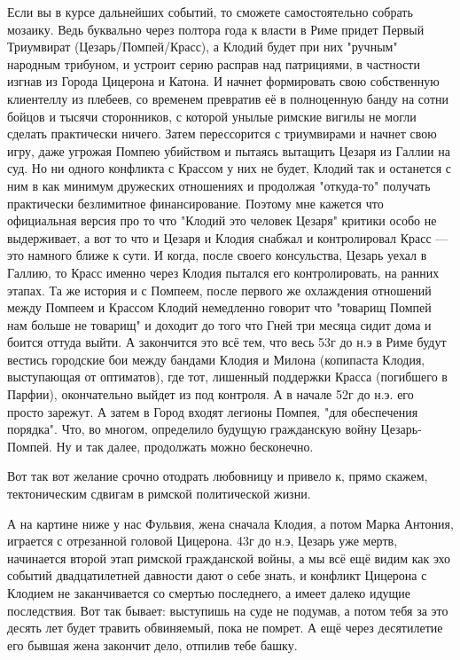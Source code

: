 Если вы в курсе дальнейших событий, то сможете самостоятельно собрать мозаику. Ведь буквально через полтора года к власти в Риме придет Первый Триумвират (Цезарь/Помпей/Красс), а Клодий будет при них "ручным" народным трибуном, и устроит серию расправ над патрициями, в частности изгнав из Города Цицерона и Катона. И начнет формировать свою собственную клиентеллу из плебеев, со временем превратив её в полноценную банду на сотни бойцов и тысячи сторонников, с которой унылые римские вигилы не могли сделать практически ничего. Затем перессорится с триумвирами и начнет свою игру, даже угрожая Помпею убийством и пытаясь вытащить Цезаря из Галлии на суд. Но ни одного конфликта с Крассом у них не будет, Клодий так и останется с ним в как минимум дружеских отношениях и продолжая "откуда-то" получать практически безлимитное финансирование. Поэтому мне кажется что официальная версия про то что "Клодий это человек Цезаря" критики особо не выдерживает, а вот то что и Цезаря и Клодия снабжал и контролировал Красс — это намного ближе к сути. И когда, после своего консульства, Цезарь уехал в Галлию, то Красс именно через Клодия пытался его контролировать, на ранних этапах. Та же история и с Помпеем, после первого же охлаждения отношений между Помпеем и Крассом Клодий немедленно говорит что "товарищ Помпей нам больше не товарищ" и доходит до того что Гней три месяца сидит дома и боится оттуда выйти. А закончится это всё тем, что весь 53г до н.э в Риме будут вестись городские бои между бандами Клодия и Милона (копипаста Клодия, выступающая от оптиматов), где тот, лишенный поддержки Красса (погибшего в Парфии), окончательно выйдет из под контроля. А в начале 52г до н.э. его просто зарежут. А затем в Город входят легионы Помпея, "для обеспечения порядка". Что, во многом, определило будущую гражданскую войну Цезарь-Помпей. Ну и так далее, продолжать можно бесконечно.


Вот так вот желание срочно отодрать любовницу и привело к, прямо скажем, тектоническим сдвигам в римской политической жизни.


А на картине ниже у нас Фульвия, жена сначала Клодия, а потом Марка Антония, играется с отрезанной головой Цицерона. 43г до н.э, Цезарь уже мертв, начинается второй этап римской гражданской войны, а мы всё ещё видим как эхо событий двадцатилетней давности дают о себе знать, и конфликт Цицерона с Клодием не заканчивается со смертью последнего, а имеет далеко идущие последствия. Вот так бывает: выступишь на суде не подумав, а потом тебя за это десять лет будет травить обвиняемый, пока не помрет. А ещё через десятилетие его бывшая жена закончит дело, отпилив тебе башку. 


